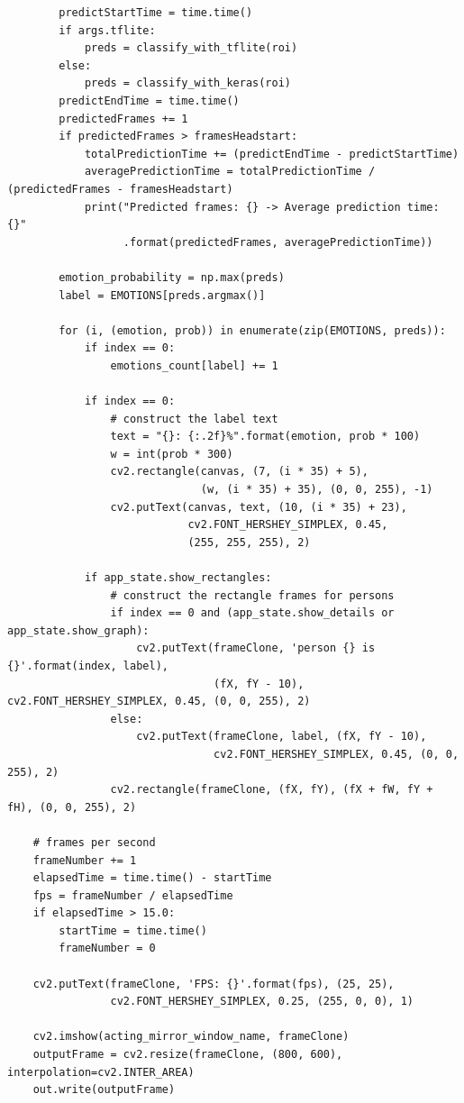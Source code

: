 \documentclass[runningheads,a4paper,11pt]{report}
\begin{document}
\begin{appendices}
\begin{lstlisting}
        predictStartTime = time.time()
        if args.tflite:
            preds = classify_with_tflite(roi)
        else:
            preds = classify_with_keras(roi)
        predictEndTime = time.time()
        predictedFrames += 1
        if predictedFrames > framesHeadstart:
            totalPredictionTime += (predictEndTime - predictStartTime)
            averagePredictionTime = totalPredictionTime / (predictedFrames - framesHeadstart)
            print("Predicted frames: {} -> Average prediction time: {}"
                  .format(predictedFrames, averagePredictionTime))

        emotion_probability = np.max(preds)
        label = EMOTIONS[preds.argmax()]

        for (i, (emotion, prob)) in enumerate(zip(EMOTIONS, preds)):
            if index == 0:
                emotions_count[label] += 1
            
            if index == 0:
                # construct the label text
                text = "{}: {:.2f}%".format(emotion, prob * 100)
                w = int(prob * 300)
                cv2.rectangle(canvas, (7, (i * 35) + 5), 
                              (w, (i * 35) + 35), (0, 0, 255), -1)
                cv2.putText(canvas, text, (10, (i * 35) + 23), 
                            cv2.FONT_HERSHEY_SIMPLEX, 0.45, 
                            (255, 255, 255), 2)
            
            if app_state.show_rectangles:
                # construct the rectangle frames for persons
                if index == 0 and (app_state.show_details or app_state.show_graph):
                    cv2.putText(frameClone, 'person {} is {}'.format(index, label), 
                                (fX, fY - 10), cv2.FONT_HERSHEY_SIMPLEX, 0.45, (0, 0, 255), 2)
                else:
                    cv2.putText(frameClone, label, (fX, fY - 10), 
                                cv2.FONT_HERSHEY_SIMPLEX, 0.45, (0, 0, 255), 2)
                cv2.rectangle(frameClone, (fX, fY), (fX + fW, fY + fH), (0, 0, 255), 2)

    # frames per second
    frameNumber += 1
    elapsedTime = time.time() - startTime
    fps = frameNumber / elapsedTime
    if elapsedTime > 15.0:
        startTime = time.time()
        frameNumber = 0
    
    cv2.putText(frameClone, 'FPS: {}'.format(fps), (25, 25), 
                cv2.FONT_HERSHEY_SIMPLEX, 0.25, (255, 0, 0), 1)

    cv2.imshow(acting_mirror_window_name, frameClone)
    outputFrame = cv2.resize(frameClone, (800, 600), interpolation=cv2.INTER_AREA)
    out.write(outputFrame)
    

\end{lstlisting}
\end{appendices}
\end{document}
